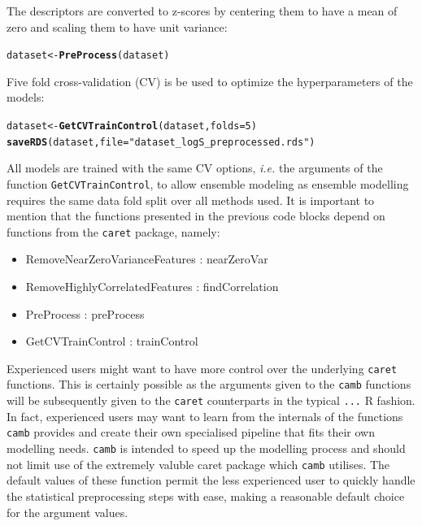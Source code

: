 \documentclass[twoside,a4wide,12pt]{article}\usepackage[]{graphicx}\usepackage[]{color}
\makeatletter
\newcommand{\hlnum}[1]{\textcolor[rgb]{0.686,0.059,0.569}{#1}}%
\newcommand{\hlstr}[1]{\textcolor[rgb]{0.192,0.494,0.8}{#1}}%
\newcommand{\hlstd}[1]{\textcolor[rgb]{0.345,0.345,0.345}{#1}}%
\newcommand{\hlkwb}[1]{\textcolor[rgb]{0.69,0.353,0.396}{#1}}%
\newcommand{\hlkwc}[1]{\textcolor[rgb]{0.333,0.667,0.333}{#1}}%
\newcommand{\hlkwd}[1]{\textcolor[rgb]{0.737,0.353,0.396}{\textbf{#1}}}%
\newenvironment{kframe}{%
 \def\at@end@of@kframe{}%
 \ifinner\ifhmode%
  \def\at@end@of@kframe{\end{minipage}}%
  \begin{minipage}{\columnwidth}%
 \fi\fi%
 \def\FrameCommand##1{\hskip\@totalleftmargin \hskip-\fboxsep
 \colorbox{shadecolor}{##1}\hskip-\fboxsep
     \hskip-\linewidth \hskip-\@totalleftmargin \hskip\columnwidth}%
 \MakeFramed {\advance\hsize-\width
   \@totalleftmargin\z@ \linewidth\hsize
   \@setminipage}}%
 {\par\unskip\endMakeFramed%
 \at@end@of@kframe}
\newenvironment{knitrout}{}{} %
\makeatother
\begin{document}
The descriptors are converted to z-scores by centering them to have a mean of zero and scaling them to have unit variance:
\begin{knitrout}
\color{fgcolor}\begin{kframe}
\begin{alltt}
\hlstd{dataset} \hlkwb{<-} \hlkwd{PreProcess}\hlstd{(dataset)}
\end{alltt}
\end{kframe}
\end{knitrout}

Five fold cross-validation (CV) is be used to optimize the hyperparameters of the models:
\begin{knitrout}
\color{fgcolor}\begin{kframe}
\begin{alltt}
\hlstd{dataset} \hlkwb{<-} \hlkwd{GetCVTrainControl}\hlstd{(dataset,} \hlkwc{folds} \hlstd{=} \hlnum{5}\hlstd{)}
\hlkwd{saveRDS}\hlstd{(dataset,} \hlkwc{file} \hlstd{=} \hlstr{"dataset_logS_preprocessed.rds"}\hlstd{)}
\end{alltt}
\end{kframe}
\end{knitrout}

All models are trained with the same CV options, {\it i.e.} the arguments of the function \texttt{GetCVTrainControl}, to allow ensemble modeling as ensemble modelling requires the same data fold split over all methods used.
It is important to mention that the functions presented in the previous code blocks depend on functions from the \texttt{caret} package, namely: 
\begin{itemize}
\item RemoveNearZeroVarianceFeatures : nearZeroVar
\item RemoveHighlyCorrelatedFeatures : findCorrelation
\item PreProcess : preProcess
\item GetCVTrainControl : trainControl
\end{itemize}
Experienced users might want to have more control over the underlying \texttt{caret} functions.
This is certainly possible as the arguments given to the \texttt{camb} functions will be subsequently given to the \texttt{caret} counterparts in the typical \texttt{...} R fashion.
In fact, experienced users may want to learn from the internals of the functions \texttt{camb} provides and create their own specialised pipeline that fits their own modelling needs. \texttt{camb} is intended to speed up the modelling process and should not limit use of the extremely valuble caret package which \texttt{camb} utilises.
The default values of these function permit the less experienced user to quickly handle the statistical preprocessing
steps with ease, making a reasonable default choice for the argument values.
\end{document}
